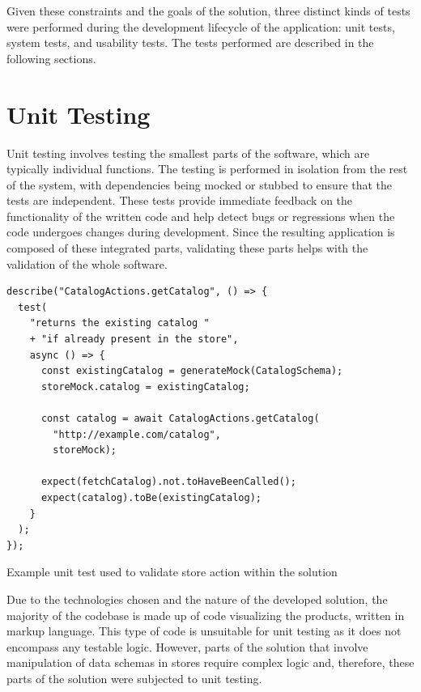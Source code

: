 Given these constraints and the goals of the solution, three distinct kinds of tests were performed during the development lifecycle of the application: unit tests, system tests, and usability tests. The tests performed are described in the following sections.


\section{Unit Testing}

Unit testing involves testing the smallest parts of the software, which are typically individual functions. The testing is performed in isolation from the rest of the system, with dependencies being mocked or stubbed to ensure that the tests are independent. These tests provide immediate feedback on the functionality of the written code and help detect bugs or regressions when the code undergoes changes during development. Since the resulting application is composed of these integrated parts, validating these parts helps with the validation of the whole software.~\cite{Khorikov2020}

\begin{listing}[h!]
\begin{verbatim}
describe("CatalogActions.getCatalog", () => {
  test(
    "returns the existing catalog " 
    + "if already present in the store",
    async () => {
      const existingCatalog = generateMock(CatalogSchema);
      storeMock.catalog = existingCatalog;

      const catalog = await CatalogActions.getCatalog(
        "http://example.com/catalog",
        storeMock);

      expect(fetchCatalog).not.toHaveBeenCalled();
      expect(catalog).toBe(existingCatalog);
    }
  );
});
\end{verbatim}
\caption{Example unit test used to validate store action within the solution}
\label{listing:unit-test}
\end{listing}

Due to the technologies chosen and the nature of the developed solution, the majority of the codebase is made up of code visualizing the products, written in markup language. This type of code is unsuitable for unit testing as it does not encompass any testable logic. However, parts of the solution that involve manipulation of data schemas in stores require complex logic and, therefore, these parts of the solution were subjected to unit testing.

